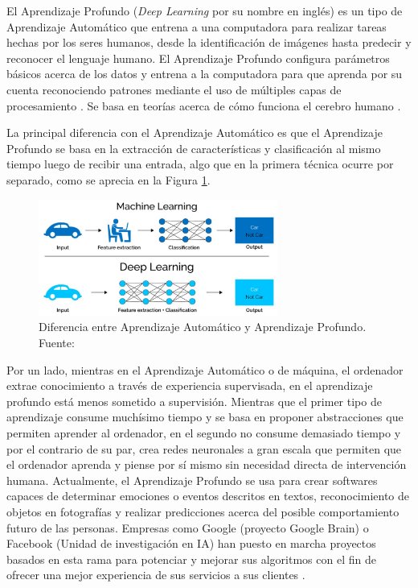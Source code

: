 El Aprendizaje Profundo (\textit{Deep Learning} por su nombre en inglés) es un tipo de Aprendizaje Automático que entrena a una computadora para realizar tareas hechas por los seres humanos, desde la identificación de imágenes hasta predecir y reconocer el lenguaje humano. El Aprendizaje Profundo configura parámetros básicos acerca de los datos y entrena a la computadora para que aprenda por su cuenta reconociendo patrones mediante el uso de múltiples capas de procesamiento \parencite{gl_sas_deeplearning}. Se basa en teorías acerca de cómo funciona el cerebro humano \parencite{tec_banafa2019deeplearning}.

La principal diferencia con el Aprendizaje Automático es que el Aprendizaje Profundo se basa en la extracción de características y clasificación al mismo tiempo luego de recibir una entrada, algo que en la primera técnica ocurre por separado, como se aprecia en la Figura \ref{2:fig5}.
\begin{figure}[!ht]
	\begin{center}
		\includegraphics[width=0.70\textwidth]{2/figures/deeplearning_machinelearning.jpg}
		\caption[Diferencia entre Aprendizaje Automático y Aprendizaje Profundo]{Diferencia entre Aprendizaje Automático y Aprendizaje Profundo.\\
		Fuente: \cite{tec_cook2018deeplearning}}
		\label{2:fig5}
	\end{center}
\end{figure}

Por un lado, mientras en el Aprendizaje Automático o de máquina, el ordenador extrae conocimiento a través de experiencia supervisada, en el aprendizaje profundo está menos sometido a supervisión. Mientras que el primer tipo de aprendizaje consume muchísimo tiempo y se basa en proponer abstracciones que permiten aprender al ordenador, en el segundo no consume demasiado tiempo y por el contrario de su par, crea redes neuronales a gran escala que permiten que el ordenador aprenda y piense por sí mismo sin necesidad directa de intervención humana. Actualmente, el Aprendizaje Profundo se usa para crear softwares capaces de determinar emociones o eventos descritos en textos, reconocimiento de objetos en fotografías y realizar predicciones acerca del posible comportamiento futuro de las personas. Empresas como Google (proyecto Google Brain) o Facebook (Unidad de investigación en IA) han puesto en marcha proyectos basados en esta rama para potenciar y mejorar sus algoritmos con el fin de ofrecer una mejor experiencia de sus servicios a sus clientes \parencite{tec_banafa2019deeplearning}.

